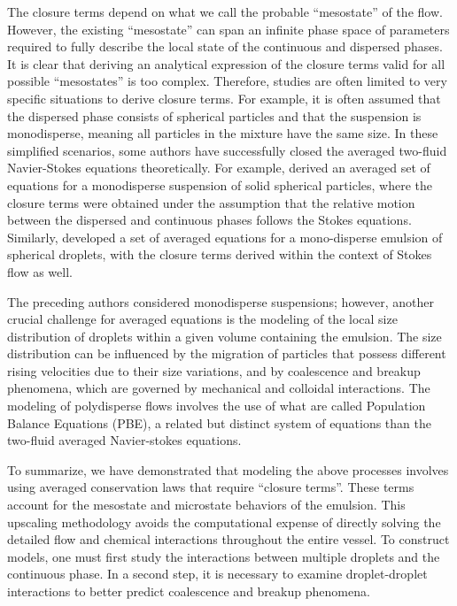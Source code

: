 The closure terms depend on what we call the probable ``mesostate'' of the flow. 
However, the existing ``mesostate'' can span an infinite phase space of parameters required to fully describe the local state of the continuous and dispersed phases.
It is clear that deriving an analytical expression of the closure terms valid for all possible ``mesostates'' is too complex.
Therefore, studies are often limited to very specific situations to derive closure terms.
For example, it is often assumed that the dispersed phase consists of spherical particles and that the suspension is monodisperse, meaning all particles in the mixture have the same size.
In these simplified scenarios, some authors have successfully closed the averaged two-fluid Navier-Stokes equations theoretically.
For example, \citet{jackson1997locally} derived an averaged set of equations for a monodisperse suspension of solid spherical particles, where the closure terms were obtained under the assumption that the relative motion between the dispersed and continuous phases follows the Stokes equations. 
Similarly, \citet{zhang1997momentum} developed a set of averaged equations for a mono-disperse emulsion of spherical droplets, with the closure terms derived within the context of Stokes flow as well.


The preceding authors considered monodisperse suspensions; however, another crucial challenge for averaged equations is the modeling of the local size distribution of droplets within a given volume containing the emulsion.
The size distribution can be influenced by the migration of particles that possess different rising velocities due to their size variations, and by coalescence and breakup phenomena, which are governed by mechanical and colloidal interactions.
The modeling of polydisperse flows involves the use of what are called Population Balance Equations (PBE), a related but distinct system of equations than the two-fluid averaged Navier-stokes equations.


To summarize, we have demonstrated that modeling the above processes involves using averaged conservation laws that require ``closure terms''. 
These terms account for the mesostate and microstate behaviors of the emulsion. 
This upscaling methodology avoids the computational expense of directly solving the detailed flow and chemical interactions throughout the entire vessel.
To construct models, one must first study the interactions between multiple droplets and the continuous phase. 
In a second step, it is necessary to examine droplet-droplet interactions to better predict coalescence and breakup phenomena. 


